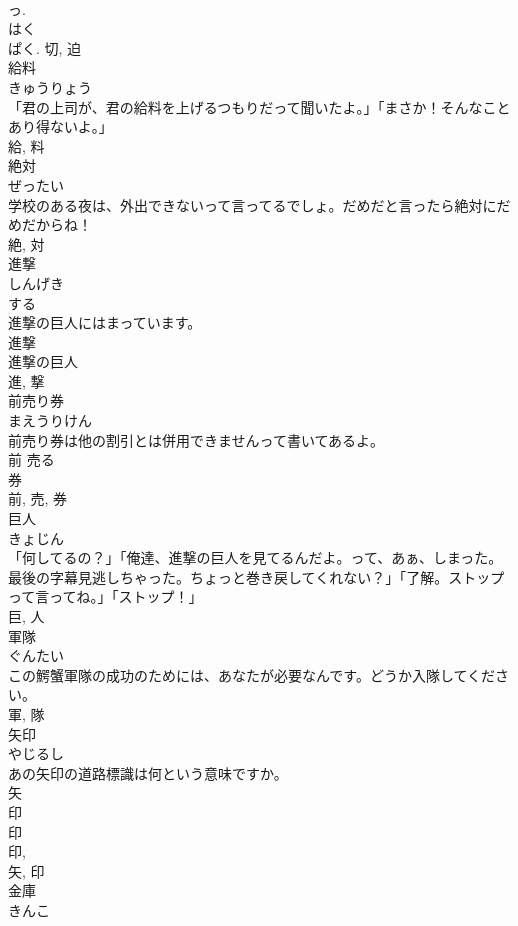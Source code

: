 \documentclass[8pt]{extreport}
\begin{document}
\begin{CJK}{UTF8}{min}
\\	っ. 
\\	はく 
\\	ぱく.	切, 迫	
\\	給料	
\\	きゅうりょう	
\\	「君の上司が、君の給料を上げるつもりだって聞いたよ。」「まさか！そんなことあり得ないよ。」	
\\	給, 料	
\\	絶対	
\\	ぜったい	
\\	学校のある夜は、外出できないって言ってるでしょ。だめだと言ったら絶対にだめだからね！	
\\	絶, 対	
\\	進撃	
\\	しんげき	
\\	する 
\\	進撃の巨人にはまっています。	
\\	進撃 
\\	進撃の巨人 
\\	進, 撃	
\\	前売り券	
\\	まえうりけん	
\\	前売り券は他の割引とは併用できませんって書いてあるよ。	
\\	前 売る 
\\	券 
\\	前, 売, 券	
\\	巨人	
\\	きょじん	
\\	「何してるの？」「俺達、進撃の巨人を見てるんだよ。って、あぁ、しまった。最後の字幕見逃しちゃった。ちょっと巻き戻してくれない？」「了解。ストップって言ってね。」「ストップ！」	
\\	巨, 人	
\\	軍隊	
\\	ぐんたい	
\\	この鰐蟹軍隊の成功のためには、あなたが必要なんです。どうか入隊してください。	
\\	軍, 隊	
\\	矢印	
\\	やじるし	
\\	あの矢印の道路標識は何という意味ですか。	
\\	矢 
\\	印 
\\	印 
\\	印, 
\\	矢, 印	
\\	金庫	
\\	きんこ	

\end{CJK}
\end{document}
